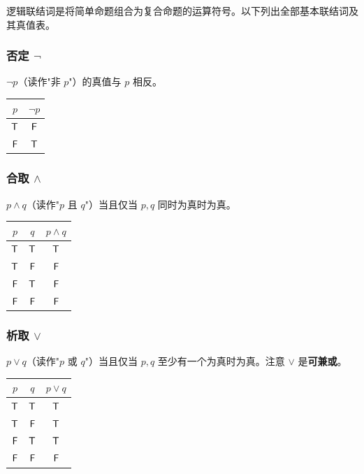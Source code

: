 逻辑联结词是将简单命题组合为复合命题的运算符号。以下列出全部基本联结词及其真值表。

\subsubsection{否定 $\neg$}

$\neg p$（读作"非 $p$"）的真值与 $p$ 相反。

\begin{center}
\begin{tabular}{c|c}
\toprule
$p$ & $\neg p$ \\
\midrule
$\mathsf{T}$ & $\mathsf{F}$ \\
$\mathsf{F}$ & $\mathsf{T}$ \\
\bottomrule
\end{tabular}
\end{center}

\subsubsection{合取 $\land$}

$p \land q$（读作"$p$ 且 $q$"）当且仅当 $p,q$ 同时为真时为真。

\begin{center}
\begin{tabular}{cc|c}
\toprule
$p$ & $q$ & $p \land q$ \\
\midrule
$\mathsf{T}$ & $\mathsf{T}$ & $\mathsf{T}$ \\
$\mathsf{T}$ & $\mathsf{F}$ & $\mathsf{F}$ \\
$\mathsf{F}$ & $\mathsf{T}$ & $\mathsf{F}$ \\
$\mathsf{F}$ & $\mathsf{F}$ & $\mathsf{F}$ \\
\bottomrule
\end{tabular}
\end{center}

\subsubsection{析取 $\lor$}

$p \lor q$（读作"$p$ 或 $q$"）当且仅当 $p,q$ 至少有一个为真时为真。注意 $\lor$ 是\textbf{可兼或}。

\begin{center}
\begin{tabular}{cc|c}
\toprule
$p$ & $q$ & $p \lor q$ \\
\midrule
$\mathsf{T}$ & $\mathsf{T}$ & $\mathsf{T}$ \\
$\mathsf{T}$ & $\mathsf{F}$ & $\mathsf{T}$ \\
$\mathsf{F}$ & $\mathsf{T}$ & $\mathsf{T}$ \\
$\mathsf{F}$ & $\mathsf{F}$ & $\mathsf{F}$ \\
\bottomrule
\end{tabular}
\end{center}

